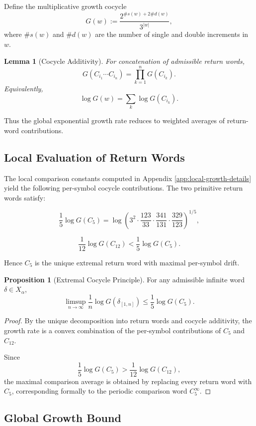 \documentclass[12pt, oneside]{article}
\numberwithin{equation}{section}
\theoremstyle{definition}
\newtheorem{proposition}{Proposition}[section]
\theoremstyle{plain}
\newtheorem{lemma}[theorem]{Lemma}
\theoremstyle{remark}
\begin{document}
Define the multiplicative growth cocycle
\[
G(w) := \frac{2^{\#s(w) + 2\#d(w)}}{3^{|w|}},
\]
where $\#s(w)$ and $\#d(w)$ are the number of single and double increments in $w$.

\begin{lemma}[Cocycle Additivity]
For concatenation of admissible return words,
\[
G(C_{i_1} \cdots C_{i_n}) = \prod_{k=1}^n G(C_{i_k}).
\]
Equivalently,
\[
\log G(w) = \sum_{k} \log G(C_{i_k}).
\]
\end{lemma}
Thus the global exponential growth rate reduces to weighted averages
of return-word contributions.


\subsection{Local Evaluation of Return Words}
The local comparison constants computed in Appendix \ref{app:local-growth-details}
yield the following per-symbol cocycle contributions. The two primitive return words satisfy:

\[
\frac{1}{5}\log G(C_5)
=
\log\!\left(
3^{2}
\cdot \frac{123}{33}
\cdot \frac{341}{131}
\cdot \frac{329}{123}
\right)^{1/5},
\]

\[
\frac{1}{12}\log G(C_{12})
<
\frac{1}{5}\log G(C_5).
\]

Hence $C_5$ is the unique extremal return word with maximal per-symbol drift.

\begin{proposition}[Extremal Cocycle Principle]
For any admissible infinite word $\delta \in X_\alpha$,
\[
\limsup_{n\to\infty}
\frac{1}{n} \log G(\delta_{[1,n]})
\le
\frac{1}{5}\log G(C_5).
\]
\end{proposition}

\begin{proof}
By the unique decomposition into return words and cocycle additivity,
the growth rate is a convex combination of the per-symbol contributions
of $C_5$ and $C_{12}$.

Since
\[
\frac{1}{5}\log G(C_5)
>
\frac{1}{12}\log G(C_{12}),
\]
the maximal comparison average is obtained by replacing every return word with $C_5$,
corresponding formally to the periodic comparison word $C_5^\infty$.
\end{proof}


\subsection{Global Growth Bound}
\end{document}

